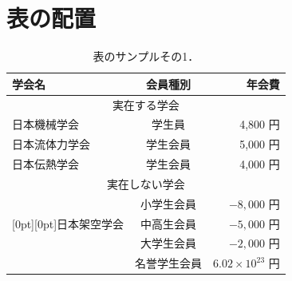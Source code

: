 \section{表の配置}
\label{sec:table}

\begin{table}[tp]
    \centering
    \caption{表のサンプルその1．}
    \label{table:sample1}
    \begin{tabular}{l|c|r} \hline\hline
        学会名  & 会員種別  & 年会費 \\ \hline
        \multicolumn{3}{c}{実在する学会} \\ \hline
        日本機械学会    & 学生員    & 4,800 円 \\ \hline
        日本流体力学会  & 学生会員  & 5,000 円 \\ \hline
        日本伝熱学会    & 学生会員  & 4,000 円 \\ \hline
        \multicolumn{3}{c}{実在しない学会} \\ \hline
        & 小学生会員  & $-8,000$ 円 \\ \cline{2-3}
        \raisebox{-0.5\normalbaselineskip}[0pt][0pt]{日本架空学会} & 中高生会員  & $-5,000$ 円 \\ \cline{2-3}
        & 大学生会員  & $-2,000$ 円 \\ \cline{2-3}
        & 名誉学生会員  & $6.02 \times 10^{23}$ 円 \\ \hline
    \end{tabular}
\end{table}





